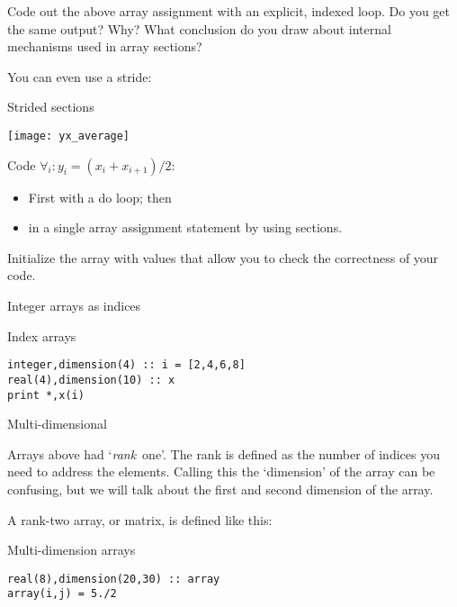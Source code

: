 \begin{exercise}
  \label{ex:sect-vs-loop}
  Code out the above array assignment with an explicit,
  indexed loop. Do you get the same output? Why? What conclusion do
  you draw about internal mechanisms used in array sections?
\end{exercise}

You can even use a stride:

\begin{block}{Strided sections}
  \label{sl:farray-strideassign}
\end{block}

\begin{exercise}
  \label{ex:farray-shift}

  \texttt{[image: yx\_average]}

  Code $\forall_i\colon y_i=(x_i+x_{i+1})/2$:
  \begin{itemize}
  \item First with a do loop; then
  \item in a single array assignment statement by using sections.
  \end{itemize}
  Initialize the array  with values that allow you to check the
  correctness of your code.
\end{exercise}

 {Integer arrays as indices}

\begin{block}{Index arrays}
  \label{sl:farray-indexarray}
\begin{verbatim}
integer,dimension(4) :: i = [2,4,6,8]
real(4),dimension(10) :: x
print *,x(i)
\end{verbatim}
\end{block}

 {Multi-dimensional}

Arrays above had `\emph{rank}~one'. The rank is
defined as the number of indices you need to address the
elements. Calling this the `dimension' of the array can be confusing, but
we will talk about the first and second dimension of the array.

A rank-two array, or matrix, is defined like this:
\begin{block}{Multi-dimension arrays}
  \label{sl:farray-2d}
\begin{verbatim}
real(8),dimension(20,30) :: array
array(i,j) = 5./2
\end{verbatim}
\end{block}

